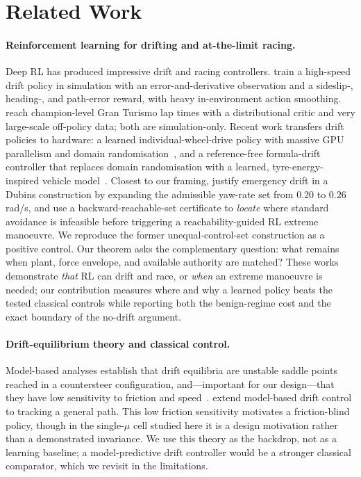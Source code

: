 \documentclass[11pt]{article}
\begin{document}
\section{Related Work}
\paragraph{Reinforcement learning for drifting and at-the-limit racing.}
Deep RL has produced impressive drift and racing controllers. \citet{cai2020high} train a
high-speed drift policy in simulation with an error-and-derivative observation and a sideslip-,
heading-, and path-error reward, with heavy in-environment action smoothing.
\citet{wurman2022outracing} reach champion-level Gran Turismo lap times with a distributional critic
and very large-scale off-policy data; both are simulation-only. Recent work transfers drift policies
to hardware: a learned individual-wheel-drive policy with massive GPU parallelism and domain
randomisation~\citep{zhou2025learning}, and a reference-free formula-drift controller that replaces
domain randomisation with a learned, tyre-energy-inspired vehicle model~\citep{djeumou2024reference}.
Closest to our framing, \citet{zhao2022justifying} justify emergency drift in a Dubins construction by
expanding the admissible yaw-rate set from $0.20$ to $0.26$\,rad/s, and
\citet{zhao2024autonomous} use a backward-reachable-set certificate to \emph{locate} where standard
avoidance is infeasible before triggering a reachability-guided RL extreme manoeuvre. We reproduce
the former unequal-control-set construction as a positive control. Our theorem asks the complementary
question: what remains when plant, force envelope, and available authority are matched? These works
demonstrate \emph{that} RL can drift and race, or \emph{when} an extreme manoeuvre is needed; our
contribution measures where and why a learned policy beats the tested classical controls while
reporting both the benign-regime cost and the exact boundary of the no-drift argument.

\paragraph{Drift-equilibrium theory and classical control.}
Model-based analyses establish that drift equilibria are unstable saddle points reached in a
countersteer configuration, and---important for our design---that they have low sensitivity to
friction and speed~\citep{velenis2010analysis}. \citet{goh2020toward} extend model-based drift
control to tracking a general path. This low friction sensitivity motivates a friction-blind
policy, though in the single-$\mu$ cell studied here it is a design motivation rather than a
demonstrated invariance. We use this theory as the backdrop, not as a learning baseline; a
model-predictive drift controller would be a stronger classical comparator, which we revisit in
the limitations.
\end{document}
